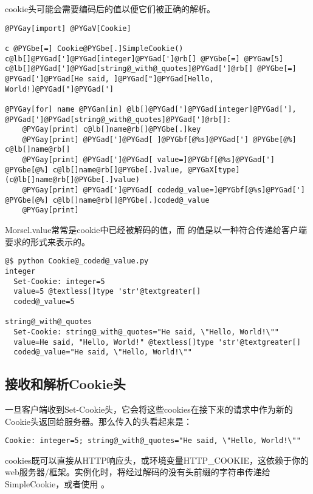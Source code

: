 \documentclass[a4paper,10pt,english]{manual}
\begin{document}
cookie头可能会需要编码后的值以便它们被正确的解析。

\begin{Verbatim}[commandchars=@\[\]]
@PYGay[import] @PYGaV[Cookie]

c @PYGbe[=] Cookie@PYGbe[.]SimpleCookie()
c@lb[]@PYGad[']@PYGad[integer]@PYGad[']@rb[] @PYGbe[=] @PYGaw[5]
c@lb[]@PYGad[']@PYGad[string@_with@_quotes]@PYGad[']@rb[] @PYGbe[=] @PYGad[']@PYGad[He said, ]@PYGad["]@PYGad[Hello, World!]@PYGad["]@PYGad[']

@PYGay[for] name @PYGan[in] @lb[]@PYGad[']@PYGad[integer]@PYGad['], @PYGad[']@PYGad[string@_with@_quotes]@PYGad[']@rb[]:
    @PYGay[print] c@lb[]name@rb[]@PYGbe[.]key
    @PYGay[print] @PYGad[']@PYGad[ ]@PYGbf[@%s]@PYGad['] @PYGbe[@%] c@lb[]name@rb[]
    @PYGay[print] @PYGad[']@PYGad[ value=]@PYGbf[@%s]@PYGad['] @PYGbe[@%] c@lb[]name@rb[]@PYGbe[.]value, @PYGaX[type](c@lb[]name@rb[]@PYGbe[.]value)
    @PYGay[print] @PYGad[']@PYGad[ coded@_value=]@PYGbf[@%s]@PYGad['] @PYGbe[@%] c@lb[]name@rb[]@PYGbe[.]coded@_value
    @PYGay[print]
\end{Verbatim}

Morsel.value常常是cookie中已经被解码的值，而  的值是以一种符合传递给客户端要求的形式来表示的。

\begin{Verbatim}[commandchars=@\[\]]
@$ python Cookie@_coded@_value.py
integer
  Set-Cookie: integer=5
  value=5 @textless[]type 'str'@textgreater[]
  coded@_value=5

string@_with@_quotes
  Set-Cookie: string@_with@_quotes="He said, \"Hello, World!\""
  value=He said, "Hello, World!" @textless[]type 'str'@textgreater[]
  coded@_value="He said, \"Hello, World!\""
\end{Verbatim}


\subsection{接收和解析Cookie头}

一旦客户端收到Set-Cookie头，它会将这些cookies在接下来的请求中作为新的Cookie头返回给服务器。那么传入的头看起来是：

\begin{Verbatim}[commandchars=@\[\]]
Cookie: integer=5; string@_with@_quotes="He said, \"Hello, World!\""
\end{Verbatim}

cookies既可以直接从HTTP响应头，或环境变量HTTP\_COOKIE，这依赖于你的web服务器/框架。实例化时，将经过解码的没有头前缀的字符串传递给SimpleCookie，或者使用  。
\end{document}
